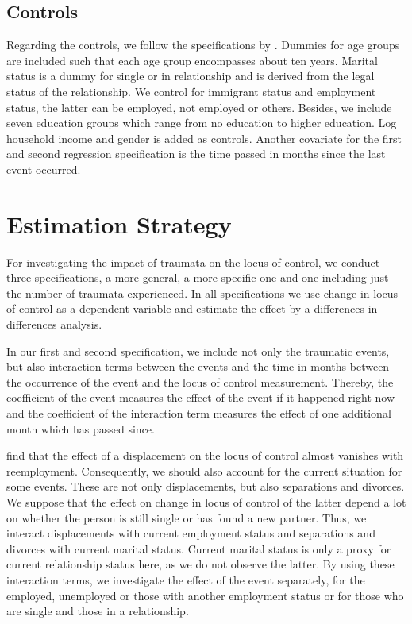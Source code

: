\documentclass[12pt, a4paper, fleqn, parskip]{scrartcl}
\begin{document}
\subsection{Controls} %
\label{sub:controls}

Regarding the controls, we follow the specifications by \citet{cobb2013}. Dummies for
age groups are included such that each age group encompasses about ten years. Marital
status is a dummy for single or in relationship and is derived from the legal status of
the relationship. We control for immigrant status and employment status, the latter can
be employed, not employed or others. Besides, we include seven education groups which
range from no education to higher education. Log household income and gender is added as
controls. Another covariate for the first and second regression specification is the
time passed in months since the last event occurred.



\section{Estimation Strategy}
\label{sec:estimation_strategy}

For investigating the impact of traumata on the locus of control, we conduct three
specifications, a more general, a more specific one and one including just the number of
traumata experienced. In all specifications we use change in locus of control as a
dependent variable and estimate the effect by a differences-in-differences analysis.

In our first and second specification, we include not only the traumatic events, but
also interaction terms between the events and the time in months between the occurrence
of the event and the locus of control measurement. Thereby, the coefficient of the event
measures the effect of the event if it happened right now and the coefficient of the
interaction term measures the effect of one additional month which has passed since.

\citet{preuss2017} find that the effect of a displacement on the locus of control almost
vanishes with reemployment. Consequently, we should also account for the current
situation for some events. These are not only displacements, but also separations and
divorces. We suppose that the effect on change in locus of control of the latter depend
a lot on whether the person is still single or has found a new partner. Thus, we
interact displacements with current employment status and separations and divorces with
current marital status. Current marital status is only a proxy for current relationship
status here, as we do not observe the latter. By using these interaction terms, we
investigate the effect of the event separately, for the employed, unemployed or those
with another employment status or for those who are single and those in a relationship.
\end{document}
